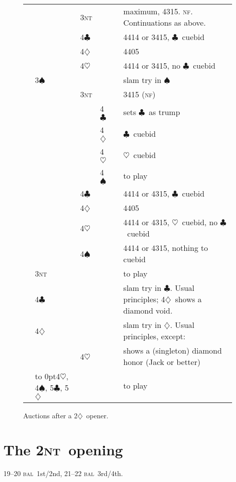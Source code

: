 \documentclass{report}
\newcommand{\fs}{1st/2nd}
\newcommand{\tf}{3rd/4th}
\newcommand{\bal}{\textsc{bal}}
\newcommand{\nf}{\textsc{nf}}
\renewcommand{\c}{\ensuremath{\clubsuit}}
\renewcommand{\d}{\ensuremath{\diamondsuit}}
\newcommand{\h}{\ensuremath{\heartsuit}}
\newcommand{\s}{\ensuremath{\spadesuit}}
\newcommand{\nt}{\textsc{nt}}
\newcommand{\+}{\ensuremath{^+}}
\begin{document}
\begin{figure}[ht]
\begin{tabular}{llllll}
&    &3\nt&&&maximum, 4315.  \nf.  Continuations as above.\\
&    &4\c &&&4414 or 3415, \c\ cuebid\\
&    &4\d &&&4405\\
&    &4\h &&&4414 or 3415, no \c\ cuebid\\
&3\s &&&&slam try in \s\\
&    &3\nt&&&3415 (\nf)\\
&    &    &4\c &&sets \c\ as trump\\
&    &    &4\d &&\c\ cuebid\\
&    &    &4\h &&\h\ cuebid\\
&    &    &4\s &&to play\\
&    &4\c &&&4414 or 4315, \c\ cuebid\\
&    &4\d &&&4405\\
&    &4\h &&&4414 or 4315, \h\ cuebid, no \c\ cuebid\\
&    &4\s &&&4414 or 4315, nothing to cuebid\\
&3\nt&&&&to play\\
&4\c &&&&slam try in \c.  Usual principles; 4\d\ shows a diamond void.\\
&4\d &&&&slam try in \d.  Usual principles, except:\\
&    &4\h &&&shows a (singleton) diamond honor (Jack or better)\\
&\hbox to 0pt{4\h, 4\s, 5\c, 5\d\hss}&&&&to play
\end{tabular}
\caption{Auctions after a 2\d\ opener.}
\end{figure}

\chapter{The 2\nt\ opening}

19--20 \bal\ \fs, 21--22 \bal\ \tf.
\end{document}
